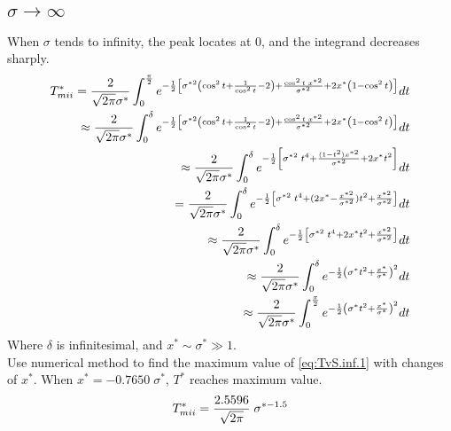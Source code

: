 \documentclass[review, 1p, number, sort&compress,table]{elsarticle}
\begin{document}
	\subsection{$\sigma\rightarrow{\infty}$}
	When $\sigma$ tends to infinity, the peak locates at $0$, and the integrand decreases sharply. 	
		\begin{eqnarray} \label{eq:TvS.inf.1}
		\nonumber 
		T^{*}_{m\uppercase\expandafter{\romannumeral2}} =\frac{2}{\sqrt{2\pi}\sigma^*}\int_{0}^{\frac{\pi}{2}} e^{-\frac{1}{2}\left[\sigma^{*2}\left(\cos^2{t}+\frac{1}{\cos^2{t}}-2 \right)+\frac{\cos^2{t} \; x^{*2}}{\sigma^{*2}}+2x^{*}\left( 1-\cos^2{t} \right)\right] }dt
		\\ \nonumber
		\approx  \frac{2}{\sqrt{2\pi}\sigma^*}\int_{0}^{\delta} e^{-\frac{1}{2}\left[\sigma^{*2}\left(\cos^2{t}+\frac{1}{\cos^2{t}}-2 \right)+\frac{\cos^2{t} \; x^{*2} }{\sigma^{*2}}+2x^{*}\left( 1-\cos^2{t} \right)\right] }dt
		\\ \nonumber
		\approx  \frac{2}{\sqrt{2\pi}\sigma^*}\int_{0}^{\delta} e^{-\frac{1}{2}\left[\sigma^{*2}\;t^4+\frac{(1-t^2)x^{*2} }{\sigma^{*2}}+2x^{*}t^2 \right] }dt
		\\ \nonumber		
		= \frac{2}{\sqrt{2\pi}\sigma^*}\int_{0}^{\delta} e^{-\frac{1}{2}\left[\sigma^{*2}\;t^4+(2x^{*}-\frac{x^{*2}}{\sigma^{*2}})t^2 +\frac{x^{*2}}{\sigma^{*2}}\right] }dt
		\\ \nonumber
		\approx \frac{2}{\sqrt{2\pi}\sigma^*}\int_{0}^{\delta} e^{-\frac{1}{2}\left[\sigma^{*2}\;t^4+2x^{*}t^2 +\frac{x^{*2}}{\sigma^{*2}}\right] }dt
		\\ \nonumber
		\approx \frac{2}{\sqrt{2\pi}\sigma^*}\int_{0}^{\delta} e^{-\frac{1}{2}\left(\sigma^{*}t^2+\frac{x^{*}}{\sigma^{*}}\right)^2 }dt
       \\ 
       	\approx \frac{2}{\sqrt{2\pi}\sigma^*}\int_{0}^{\frac{\pi}{2}} e^{-\frac{1}{2}\left(\sigma^{*}t^2+\frac{x^{*}}{\sigma^{*}}\right)^2 }dt
		\end{eqnarray}
	Where $\delta$ is infinitesimal, and $x^{*} \sim \sigma^{*} \gg 1$.
	\\
	Use numerical method to find the maximum value of \autoref{eq:TvS.inf.1} with changes of $x^{*}$. When $x^{*}=-0.7650 \;\sigma^{*}$, $T^{*}$ reaches maximum value.
		\begin{equation} \label{eq:TvS.inf}
			T^{*}_{m\uppercase\expandafter{\romannumeral2}}= \frac{2.5596}{\sqrt{2\pi}} \; \sigma^{*-1.5}
		\end{equation}
\end{document}
